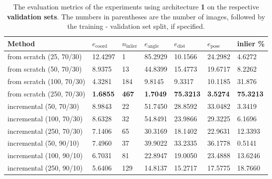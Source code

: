 \begin{table}[]
\centering
\begin{tabular}{l||llllll} 
Method                   & $e_{\text{coord}}$ & $n_{\text{inlier}}$ & $e_{\text{angle}}$ & $e_{\text{dist}}$ & $e_{\text{pose}}$  & inlier \% \\ \hline \hline 
from scratch (25, 70/30)        & 12.4297            & 1                   & 85.2929            & 10.1566           & 24.2982  & 4.6272          \\ \hline
from scratch (50, 70/30)        & 8.9375             & 13                  & 44.8399            & 15.4773           & 19.6717 & 8.2262          \\ \hline 
from scratch (100, 70/30)       & 4.3281             & 184                 & 9.8145             & 9.3317            & 10.1185    &31.876       \\ \hline
from scratch (250, 70/30)       & \textbf{1.6855}             & \textbf{467}                 & \textbf{1.7049}  &\textbf{75.3213}          & \textbf{3.5274}            & \textbf{75.3213}            \\ \hline \hline
incremental (50, 70/30)  & 8.9843            & 22                   & 51.7450           & 28.8592           & 33.0482  &3.3419         \\ \hline
incremental (100, 70/30) & 8.6328            & 32                  & 54.8491           & 23.9866           & 29.3225  &6.1696         \\ \hline 
incremental (250, 70/30) & 7.1406             & 65                  & 30.3169             & 18.1402           & 22.9631 &12.3393         \\ \hline \hline
incremental (50, 90/10)  & 7.4960            & 37                   & 39.9022           & 33.2335           & 36.1778  &0.5141        \\ \hline 
incremental (100, 90/10) & 6.7031             & 81                  & 22.8947            & 19.0050          & 23.4888  &13.6246        \\ \hline
incremental (250, 90/10) & 5.6406             & 129                 & 14.8137            & 15.2717            & 17.5775   &18.7660      
\end{tabular}
\caption{The evaluation metrics of the experiments using architecture \textbf{1} on the respective \textbf{validation sets}. The numbers in parentheses are the number of images, followed by the training - validation set split, if specified.}
\label{table:experiments_online_sratch_arch1}
\end{table}

